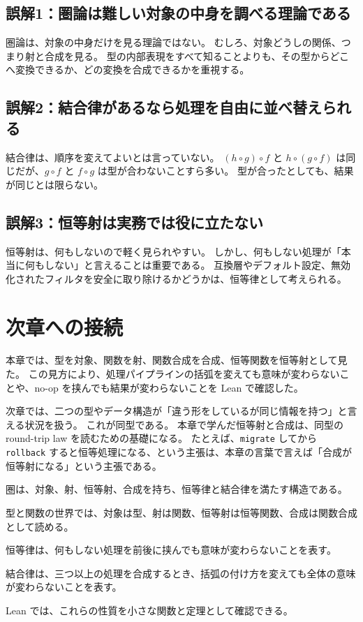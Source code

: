 \subsection{誤解1：圏論は難しい対象の中身を調べる理論である}

圏論は、対象の中身だけを見る理論ではない。
むしろ、対象どうしの関係、つまり射と合成を見る。
型の内部表現をすべて知ることよりも、その型からどこへ変換できるか、どの変換を合成できるかを重視する。

\subsection{誤解2：結合律があるなら処理を自由に並べ替えられる}

結合律は、順序を変えてよいとは言っていない。
\((h \circ g) \circ f\) と \(h \circ (g \circ f)\) は同じだが、\(g \circ f\) と \(f \circ g\) は型が合わないことすら多い。
型が合ったとしても、結果が同じとは限らない。

\subsection{誤解3：恒等射は実務では役に立たない}

恒等射は、何もしないので軽く見られやすい。
しかし、何もしない処理が「本当に何もしない」と言えることは重要である。
互換層やデフォルト設定、無効化されたフィルタを安全に取り除けるかどうかは、恒等律として考えられる。

\section{次章への接続}

本章では、型を対象、関数を射、関数合成を合成、恒等関数を恒等射として見た。
この見方により、処理パイプラインの括弧を変えても意味が変わらないことや、no-op を挟んでも結果が変わらないことを Lean で確認した。

次章では、二つの型やデータ構造が「違う形をしているが同じ情報を持つ」と言える状況を扱う。
これが同型である。
本章で学んだ恒等射と合成は、同型の round-trip law を読むための基礎になる。
たとえば、\texttt{migrate} してから \texttt{rollback} すると恒等処理になる、という主張は、本章の言葉で言えば「合成が恒等射になる」という主張である。

圏は、対象、射、恒等射、合成を持ち、恒等律と結合律を満たす構造である。

型と関数の世界では、対象は型、射は関数、恒等射は恒等関数、合成は関数合成として読める。

恒等律は、何もしない処理を前後に挟んでも意味が変わらないことを表す。

結合律は、三つ以上の処理を合成するとき、括弧の付け方を変えても全体の意味が変わらないことを表す。

Lean では、これらの性質を小さな関数と定理として確認できる。

